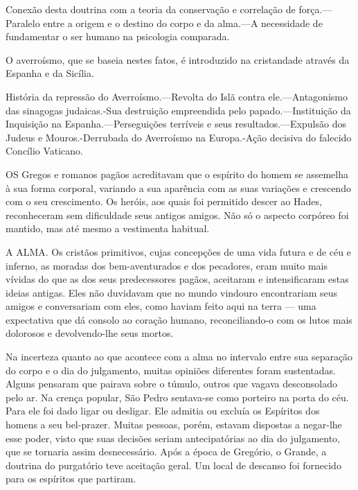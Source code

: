 \documentclass[11pt,a5paper,twoside,openany]{book}
\begin{document}
Conexão desta doutrina com a teoria da conservação e correlação de força.—Paralelo entre a origem e o destino do corpo e da alma.—A necessidade de fundamentar o ser humano na psicologia comparada.

O averroísmo, que se baseia nestes fatos, é introduzido na cristandade através da Espanha e da Sicília.

História da repressão do Averroísmo.—Revolta do Islã contra ele.—Antagonismo das sinagogas judaicas.-Sua destruição empreendida pelo papado.—Instituição da Inquisição na Espanha.—Perseguições terríveis e seus resultados.—Expulsão dos Judeus e Mouros.-Derrubada do Averroísmo na Europa.-Ação decisiva do falecido Concílio Vaticano.

OS Gregos e romanos pagãos acreditavam que o espírito do homem se assemelha à sua forma corporal, variando a sua aparência com as suas variações e crescendo com o seu crescimento. Os heróis, aos quais foi permitido descer ao Hades, reconheceram sem dificuldade seus antigos amigos. Não só o aspecto corpóreo foi mantido, mas até mesmo a vestimenta habitual.

A ALMA. Os cristãos primitivos, cujas concepções de uma vida futura e de céu e inferno, as moradas dos bem-aventurados e dos pecadores, eram muito mais vívidas do que as dos seus predecessores pagãos, aceitaram e intensificaram estas ideias antigas. Eles não duvidavam que no mundo vindouro encontrariam seus amigos e conversariam com eles, como haviam feito aqui na terra — uma expectativa que dá consolo ao coração humano, reconciliando-o com os lutos mais dolorosos e devolvendo-lhe seus mortos.

Na incerteza quanto ao que acontece com a alma no intervalo entre sua separação do corpo e o dia do julgamento, muitas opiniões diferentes foram sustentadas. Alguns pensaram que pairava sobre o túmulo, outros que vagava desconsolado pelo ar. Na crença popular, São Pedro sentava-se como porteiro na porta do céu. Para ele foi dado ligar ou desligar. Ele admitia ou excluía os Espíritos dos homens a seu bel-prazer. Muitas pessoas, porém, estavam dispostas a negar-lhe esse poder, visto que suas decisões seriam antecipatórias ao dia do julgamento, que se tornaria assim desnecessário. Após a época de Gregório, o Grande, a doutrina do purgatório teve aceitação geral. Um local de descanso foi fornecido para os espíritos que partiram.
\end{document}
